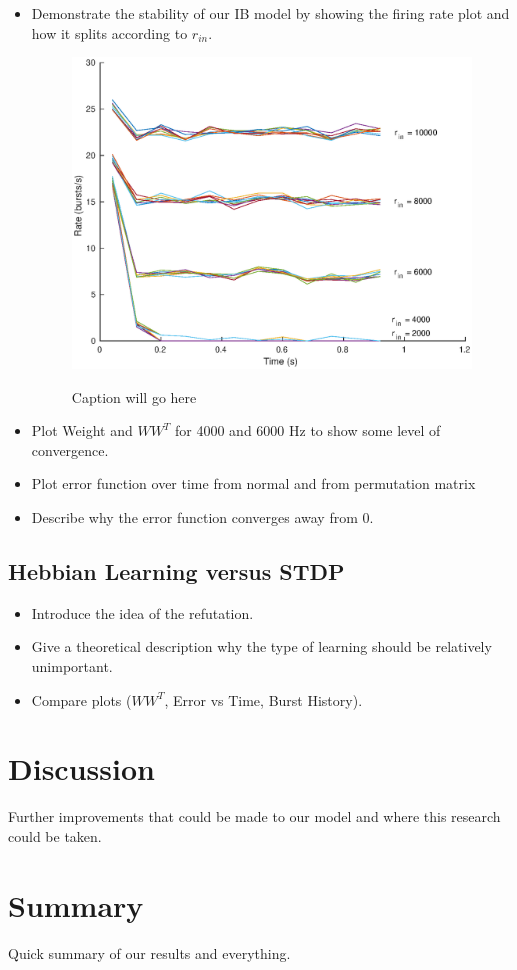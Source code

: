 \documentclass[12pt, final]{article}
\begin{document}
\begin{itemize}
\item Demonstrate the stability of our IB model by showing the firing rate plot and how it splits according to \(r_{in}\).

\begin{figure}[H]
\centering
\includegraphics[scale = 0.4]{Firing_Rate_Binsize_80ms.eps}
\label{FR}
\caption{Caption will go here}
\end{figure}

\item Plot Weight and \(WW^T\) for 4000 and 6000 Hz to show some level of convergence.

\item Plot error function over time from normal and from permutation matrix

\item Describe why the error function converges away from 0.
\end{itemize}

\subsection{Hebbian Learning versus STDP}

\begin{itemize}
\item Introduce the idea of the refutation. 
\item Give a theoretical description why the type of learning should be relatively unimportant.
\item Compare plots (\(WW^T\), Error vs Time, Burst History).
\end{itemize}

\section{Discussion}

Further improvements that could be made to our model and where this research could be taken.

\section{Summary}

Quick summary of our results and everything.





\end{document}
